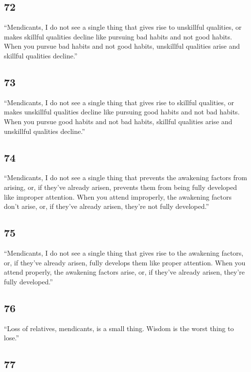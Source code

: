 \documentclass[12pt,openany]{book}%
\begin{document}
\subsection*{72 }

“Mendicants, I do not see a single thing that gives rise to unskillful qualities, or makes skillful qualities decline like pursuing bad habits and not good habits. When you pursue bad habits and not good habits, unskillful qualities arise and skillful qualities decline.” 

\subsection*{73 }

“Mendicants, I do not see a single thing that gives rise to skillful qualities, or makes unskillful qualities decline like pursuing good habits and not bad habits. When you pursue good habits and not bad habits, skillful qualities arise and unskillful qualities decline.” 

\subsection*{74 }

“Mendicants, I do not see a single thing that prevents the awakening factors from arising, or, if they’ve already arisen, prevents them from being fully developed like improper attention. When you attend improperly, the awakening factors don’t arise, or, if they’ve already arisen, they’re not fully developed.” 

\subsection*{75 }

“Mendicants, I do not see a single thing that gives rise to the awakening factors, or, if they’ve already arisen, fully develops them like proper attention. When you attend properly, the awakening factors arise, or, if they’ve already arisen, they’re fully developed.” 

\subsection*{76 }

“Loss of relatives, mendicants, is a small thing. Wisdom is the worst thing to lose.” 

\subsection*{77 }
\end{document}
